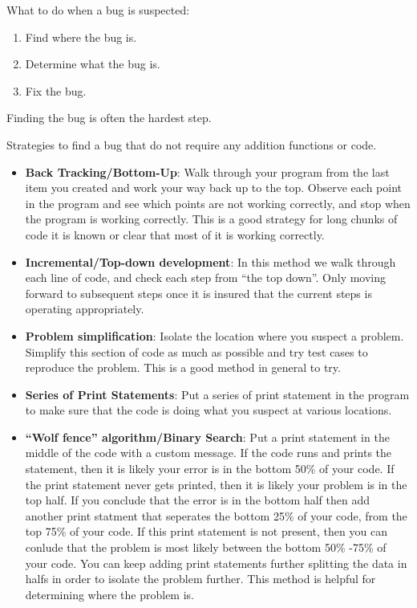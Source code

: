 \documentclass[
]{book}
\providecommand{\tightlist}{%
  \setlength{\itemsep}{0pt}\setlength{\parskip}{0pt}}
\begin{document}
What to do when a bug is suspected:

\begin{enumerate}
\def\labelenumi{\arabic{enumi})}
\tightlist
\item
  Find where the bug is.
\item
  Determine what the bug is.
\item
  Fix the bug.
\end{enumerate}

Finding the bug is often the hardest step.

Strategies to find a bug that do not require any addition functions or code.

\begin{itemize}
\item
  \textbf{Back Tracking/Bottom-Up}: Walk through your program from the last item you created and work your way back up to the top. Observe each point in the program and see which points are not working correctly, and stop when the program is working correctly. This is a good strategy for long chunks of code it is known or clear that most of it is working correctly.
\item
  \textbf{Incremental/Top-down development}: In this method we walk through each line of code, and check each step from ``the top down''. Only moving forward to subsequent steps once it is insured that the current steps is operating appropriately.
\item
  \textbf{Problem simplification}: Isolate the location where you suspect a problem. Simplify this section of code as much as possible and try test cases to reproduce the problem. This is a good method in general to try.
\item
  \textbf{Series of Print Statements}: Put a series of print statement in the program to make sure that the code is doing what you suspect at various locations.
\item
  \textbf{``Wolf fence'' algorithm/Binary Search}: Put a print statement in the middle of the code with a custom message. If the code runs and prints the statement, then it is likely your error is in the bottom 50\% of your code. If the print statement never gets printed, then it is likely your problem is in the top half. If you conclude that the error is in the bottom half then add another print statment that seperates the bottom 25\% of your code, from the top 75\% of your code. If this print statement is not present, then you can conlude that the problem is most likely between the bottom 50\% -75\% of your code. You can keep adding print statements further splitting the data in halfs in order to isolate the problem further. This method is helpful for determining where the problem is.
\end{itemize}
\end{document}
